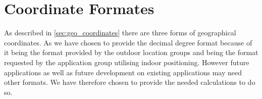 \section{Coordinate Formates}
As described in \cref{sec:geo_coordinates} there are three forms of geographical coordinates. As we have chosen to provide the decimal degree format because of it being the format provided by the outdoor location groups and being the format requested by the application group utilising indoor positioning.
However future applications as well as future development on existing applications may need other formats. We have therefore chosen to provide the needed calculations to do so.  